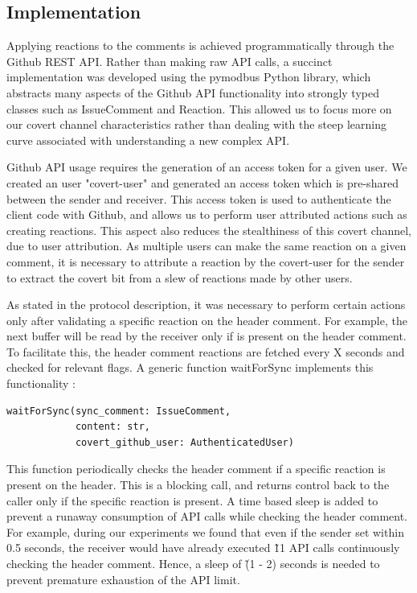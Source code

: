 \documentclass[conference]{IEEEtran}
\begin{document}
\subsection{Implementation}
Applying reactions to the comments is achieved programmatically through the Github REST API. Rather than making raw API calls, a succinct implementation was developed using the pymodbus Python library, which abstracts many aspects of the Github API functionality into strongly typed classes such as IssueComment and Reaction. This allowed us to focus more on our covert channel characteristics rather than dealing with the steep learning curve associated with understanding a new complex API. 

Github API usage requires the generation of an access token for a given user. We created an user "covert-user" and generated an access token which is pre-shared between the sender and receiver. This access token is used to authenticate the client code with Github, and allows us to perform user attributed actions such as creating reactions. This aspect also reduces the stealthiness of this covert channel, due to user attribution. As multiple users can make the same reaction on a given comment, it is necessary to attribute a reaction by the covert-user for the sender to extract the covert bit from a slew of reactions made by other users. 

As stated in the protocol description, it was necessary to perform certain actions only after validating a specific reaction on the header comment. For example, the next buffer will be read by the receiver only if  is present on the header comment. To facilitate this, the header comment reactions are fetched every X seconds and checked for relevant flags. A generic function waitForSync implements this functionality : 
\begin{verbatim}
waitForSync(sync_comment: IssueComment, 
            content: str, 
            covert_github_user: AuthenticatedUser)
\end{verbatim}
This function periodically checks the header comment if a specific reaction is present on the header. This is a blocking call, and returns control back to the caller only if the specific reaction is present. A time based sleep is added to prevent a runaway consumption of API calls while checking the header comment. For example, during our experiments we found that even if the sender set  within 0.5 seconds, the receiver would have already executed \~ 11 API calls continuously checking the header comment. Hence, a sleep of \~ (1 - 2) seconds is needed to prevent premature exhaustion of the API limit. 
\end{document}
